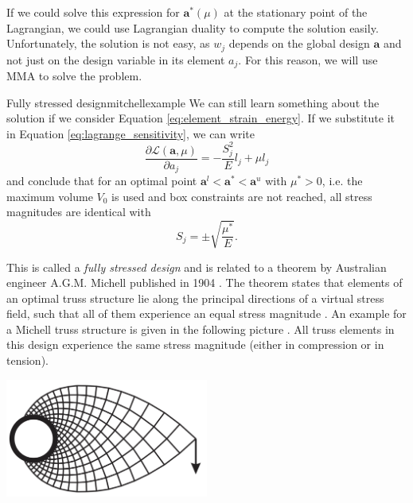 If we could solve this expression for $\mathbf{a}^*(\mu)$ at the stationary point of the Lagrangian, we could use Lagrangian duality to compute the solution easily. Unfortunately, the solution is not easy, as $w_j$ depends on the global design $\mathbf{a}$ and not just on the design variable in its element $a_j$. For this reason, we will use MMA to solve the problem.

\begin{example}{Fully stressed design}{mitchellexample}
    We can still learn something about the solution if we consider Equation \eqref{eq:element_strain_energy}. If we substitute it in Equation \eqref{eq:lagrange_sensitivity}, we can write 
    \begin{equation}
        \frac{\partial \mathcal{L} (\mathbf{a}, \mu)}{\partial a_j} = - \frac{S^2_j}{E} l_j + \mu l_j
    \end{equation}
    and conclude that for an optimal point $\mathbf{a}^l < \mathbf{a}^* < \mathbf{a}^u$ with $\mu^*>0$, i.e. the maximum volume $V_0$ is used and box constraints are not reached, all stress magnitudes are identical with
    \begin{equation}
        S_j = \pm \sqrt{\frac{\mu^*}{E}}.
    \end{equation}
    
    This is called a \emph{fully stressed design} and is related to a theorem by Australian engineer A.G.M. Michell published in 1904 \cite{Michell1904}. The theorem states that elements of an optimal truss structure lie along the principal directions of a virtual stress field, such that all of them experience an equal stress magnitude \cite{Arora2019}.
    An example for a Michell truss structure is given in the following picture \cite{Picelli2015}. All truss elements in this design experience the same stress magnitude (either in compression or in tension).
    \begin{center}
        \includegraphics[width=0.5\textwidth]{figures/michell.png}
    \end{center}
    
\end{example}

